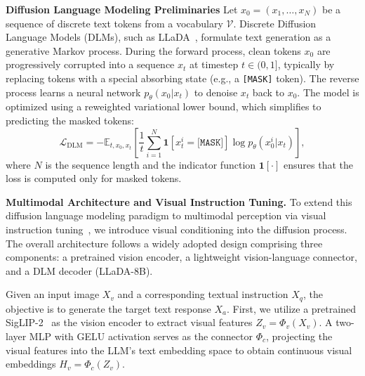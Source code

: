 \documentclass{llmxive}
\begin{document}
\noindent
\textbf{Diffusion Language Modeling Preliminaries}
Let $x_0 = (x_1, \dots, x_N)$ be a sequence of discrete text tokens from a vocabulary $\mathcal{V}$. Discrete Diffusion Language Models (DLMs), such as LLaDA~\citep{nielarge}, formulate text generation as a generative Markov process. During the forward process, clean tokens $x_0$ are progressively corrupted into a sequence $x_t$ at timestep $t \in (0, 1]$, typically by replacing tokens with a special absorbing state (e.g., a \texttt{[MASK]} token). The reverse process learns a neural network $p_\theta(x_0 | x_t)$ to denoise $x_t$ back to $x_0$. The model is optimized using a reweighted variational lower bound, which simplifies to predicting the masked tokens:
\begin{equation}
\mathcal{L}_{\mathrm{DLM}} = -\mathbb{E}_{t, x_0, x_t} \left[ \frac{1}{t} \sum_{i=1}^{N} \mathbf{1}[x_t^i = \texttt{[MASK]}] \log p_\theta(x_0^i|x_t) \right],
\end{equation}
where $N$ is the sequence length and the indicator function $\mathbf{1}[\cdot]$ ensures that the loss is computed only for masked tokens.

\noindent
\textbf{Multimodal Architecture and Visual Instruction Tuning.}
To extend this diffusion language modeling paradigm to multimodal perception via visual instruction tuning~\citep{liu2023visual}, we introduce visual conditioning into the diffusion process. The overall architecture follows a widely adopted design comprising three components: a pretrained vision encoder, a lightweight vision-language connector, and a DLM decoder (LLaDA-8B).

Given an input image $X_v$ and a corresponding textual instruction $X_q$, the objective is to generate the target text response $X_a$. First, we utilize a pretrained SigLIP-2~\citep{tschannen2025siglip} as the vision encoder to extract visual features $Z_v = \Phi_v(X_v)$. A two-layer MLP with GELU activation serves as the connector $\Phi_{c}$, projecting the visual features into the LLM's text embedding space to obtain continuous visual embeddings $H_v = \Phi_c(Z_v)$.
\end{document}
